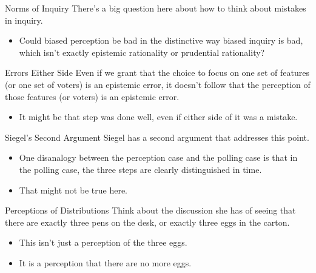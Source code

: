 \documentclass[
  17pt,
  letterpaper,
  ignorenonframetext,
  aspectratio=169,
  handout,
  xcolor={dvipsnames}]{beamer}
\providecommand{\tightlist}{%
  \setlength{\itemsep}{0pt}\setlength{\parskip}{0pt}}\usepackage{longtable,booktabs,array}
\begin{document}
\begin{frame}{Norms of Inquiry}
\protect\hypertarget{norms-of-inquiry-1}{}
There's a big question here about how to think about mistakes in
inquiry.

\begin{itemize}[<+->]
\tightlist
\item
  Could biased perception be bad in the distinctive way biased inquiry
  is bad, which isn't exactly epistemic rationality or prudential
  rationality?
\end{itemize}
\end{frame}

\begin{frame}{Errors Either Side}
\protect\hypertarget{errors-either-side}{}
Even if we grant that the choice to focus on one set of features (or one
set of voters) is an epistemic error, it doesn't follow that the
perception of those features (or voters) is an epistemic error.

\begin{itemize}[<+->]
\tightlist
\item
  It might be that step was done well, even if either side of it was a
  mistake.
\end{itemize}
\end{frame}

\begin{frame}{Siegel's Second Argument}
\protect\hypertarget{siegels-second-argument}{}
Siegel has a second argument that addresses this point.

\begin{itemize}[<+->]
\tightlist
\item
  One disanalogy between the perception case and the polling case is
  that in the polling case, the three steps are clearly distinguished in
  time.
\item
  That might not be true here.
\end{itemize}
\end{frame}

\begin{frame}{Perceptions of Distributions}
\protect\hypertarget{perceptions-of-distributions}{}
Think about the discussion she has of seeing that there are exactly
three pens on the desk, or exactly three eggs in the carton.

\begin{itemize}[<+->]
\tightlist
\item
  This isn't just a perception of the three eggs.
\item
  It is a perception that there are no more eggs.
\end{itemize}
\end{frame}
\end{document}
